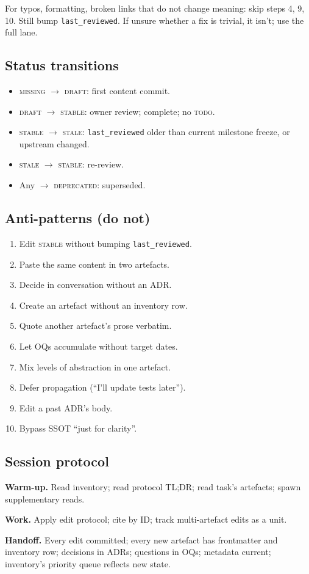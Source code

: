 \documentclass[11pt,a4paper,twocolumn]{article}
\begin{document}
For typos, formatting, broken links that do not change meaning:
skip steps 4, 9, 10. Still bump \texttt{last\_reviewed}. If unsure
whether a fix is trivial, it isn't; use the full lane.

\subsection*{Status transitions}

\begin{itemize}[nosep,leftmargin=1.2em]
\item \textsc{missing} $\to$ \textsc{draft}: first content commit.
\item \textsc{draft} $\to$ \textsc{stable}: owner review; complete; no \textsc{todo}.
\item \textsc{stable} $\to$ \textsc{stale}: \texttt{last\_reviewed} older than current milestone freeze, or upstream changed.
\item \textsc{stale} $\to$ \textsc{stable}: re-review.
\item Any $\to$ \textsc{deprecated}: superseded.
\end{itemize}

\subsection*{Anti-patterns (do not)}

\begin{enumerate}[nosep,leftmargin=1.2em]
\item Edit \textsc{stable} without bumping \texttt{last\_reviewed}.
\item Paste the same content in two artefacts.
\item Decide in conversation without an ADR.
\item Create an artefact without an inventory row.
\item Quote another artefact's prose verbatim.
\item Let OQs accumulate without target dates.
\item Mix levels of abstraction in one artefact.
\item Defer propagation (``I'll update tests later'').
\item Edit a past ADR's body.
\item Bypass SSOT ``just for clarity''.
\end{enumerate}

\subsection*{Session protocol}

\textbf{Warm-up.} Read inventory; read protocol TL;DR; read task's
artefacts; spawn supplementary reads.

\textbf{Work.} Apply edit protocol; cite by ID; track multi-artefact
edits as a unit.

\textbf{Handoff.} Every edit committed; every new artefact has
frontmatter and inventory row; decisions in ADRs; questions in OQs;
metadata current; inventory's priority queue reflects new state.
\end{document}
